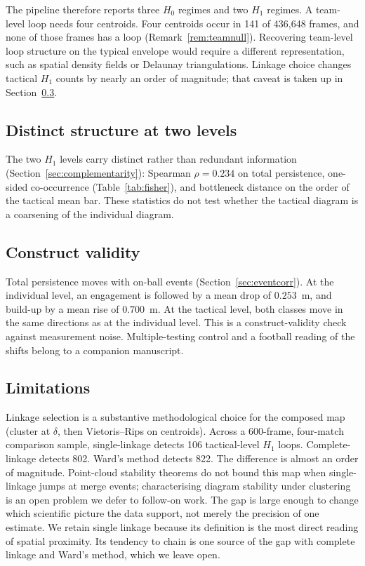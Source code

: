 The pipeline therefore reports three $H_0$ regimes and two $H_1$
regimes. A team-level loop needs four centroids. Four centroids occur in
141 of 436{,}648 frames, and none of those frames has a loop
(Remark~\ref{rem:teamnull}). Recovering
team-level loop structure on the typical envelope would require a
different representation, such as spatial density fields or Delaunay
triangulations. Linkage choice changes tactical $H_1$ counts by nearly
an order of magnitude; that caveat is taken up in
Section~\ref{sec:limitations}.

\subsection{Distinct structure at two levels}
\label{sec:disc-distinct}

The two $H_1$ levels carry distinct rather than redundant
information (Section~\ref{sec:complementarity}): Spearman
$\rho=0.234$ on total persistence, one-sided co-occurrence
(Table~\ref{tab:fisher}), and bottleneck distance on the order of
the tactical mean bar. These statistics do not test whether the
tactical diagram is a coarsening of the individual diagram.

\subsection{Construct validity}
\label{sec:disc-validity}

Total persistence moves with on-ball events
(Section~\ref{sec:eventcorr}). At the individual level, an engagement
is followed by a mean drop of $0.253$~m, and build-up by a mean rise
of $0.700$~m. At the tactical level, both classes move in the same
directions as at the individual level. This is a construct-validity check against measurement
noise. Multiple-testing control and a football reading of the shifts
belong to a companion manuscript.

\subsection{Limitations}
\label{sec:limitations}

Linkage selection is a substantive methodological choice for the
composed map (cluster at $\delta$, then Vietoris--Rips on centroids).
Across a 600-frame, four-match comparison sample, single-linkage
detects 106 tactical-level $H_1$ loops. Complete-linkage detects 802.
Ward's method detects 822. The difference is almost an order of
magnitude. Point-cloud stability theorems do not bound this map when
single-linkage jumps at merge events; characterising diagram stability
under clustering is an open problem we defer to follow-on work. The gap is large enough to change which scientific picture
the data support, not merely the precision of one estimate. We retain
single linkage because its definition is the most direct reading of
spatial proximity. Its tendency to chain is one source of the gap
with complete linkage and Ward's method, which we leave open.

